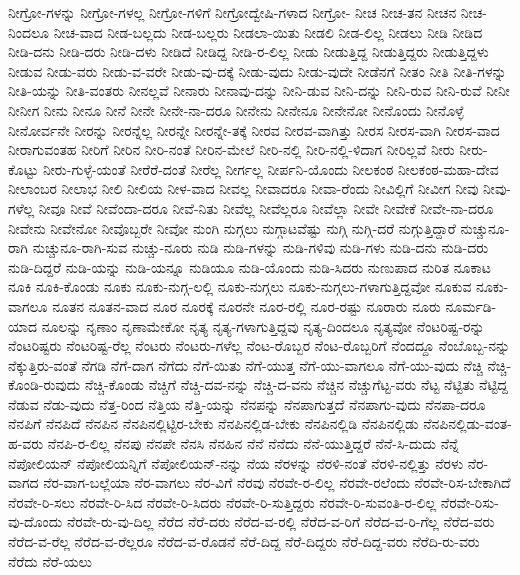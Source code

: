 {ನೀಗ್ರೋ-ಗಳನ್ನು
ನೀಗ್ರೋ-ಗಳಲ್ಲ
ನೀಗ್ರೋ-ಗಳಿಗೆ
ನೀಗ್ರೋದ್ವೇಷಿ-ಗಳಾದ
ನೀಗ್ರೋ-
ನೀಚ
ನೀಚ-ತನ
ನೀಚನ
ನೀಚ-ನಿಂದಲೂ
ನೀಚ-ವಾದ
ನೀಡ-ಬಲ್ಲದು
ನೀಡ-ಬಲ್ಲರು
ನೀಡಲಾ-ಯಿತು
ನೀಡಲಿ
ನೀಡ-ಲಿಲ್ಲ
ನೀಡಲು
ನೀಡಿ
ನೀಡಿದ
ನೀಡಿ-ದನು
ನೀಡಿ-ದರು
ನೀಡಿ-ದಳು
ನೀಡಿದೆ
ನೀಡಿದ್ದ
ನೀಡಿ-ರ-ಲಿಲ್ಲ
ನೀಡು
ನೀಡುತ್ತಿದ್ದ
ನೀಡುತ್ತಿದ್ದರು
ನೀಡುತ್ತಿದ್ದಳು
ನೀಡುವ
ನೀಡು-ವರು
ನೀಡು-ವ-ವರೇ
ನೀಡು-ವು-ದಕ್ಕೆ
ನೀಡು-ವುದು
ನೀಡು-ವುದೇ
ನೀಡೆನಗೆ
ನೀತಂ
ನೀತಿ
ನೀತಿ-ಗಳನ್ನು
ನೀತಿ-ಯನ್ನು
ನೀತಿ-ವಂತರು
ನೀನಲ್ಲವೆ
ನೀನಾರು
ನೀನಾವು-ದನ್ನು
ನೀನಿ-ಡುವ
ನೀನಿ-ದನ್ನು
ನೀನಿ-ರುವ
ನೀನಿ-ರುವೆ
ನೀನೀ
ನೀನೀಗ
ನೀನು
ನೀನೂ
ನೀನೆ
ನೀನೇ
ನೀನೇ-ನಾ-ದರೂ
ನೀನೇನು
ನೀನೇನೂ
ನೀನೇನೋ
ನೀನೊಂದು
ನೀನೊಳ್ಳೆ
ನೀನೋರ್ವನೇ
ನೀರನ್ನು
ನೀರನ್ನೆಲ್ಲ
ನೀರನ್ನೇ
ನೀರನ್ನೇ-ತಕ್ಕೆ
ನೀರವ
ನೀರವ-ವಾಗಿತ್ತು
ನೀರಸ
ನೀರಸ-ವಾಗಿ
ನೀರಸ-ವಾದ
ನೀರಾಗುವಂತಹ
ನೀರಿಗೆ
ನೀರಿನ
ನೀರಿ-ನಂತೆ
ನೀರಿನ-ಮೇಲೆ
ನೀರಿ-ನಲ್ಲಿ
ನೀರಿ-ನಲ್ಲಿ-ಳಿದಾಗ
ನೀರಿಲ್ಲವೆ
ನೀರು
ನೀರು-ಕೊಟ್ಟು
ನೀರು-ಗುಳ್ಳೆ-ಯಂತೆ
ನೀರೆರೆ-ದಂತೆ
ನೀರೆಲ್ಲ
ನೀರ್ಗಲ್ಲ
ನೀರ್ಪನಿ-ಯೊಂದು
ನೀಲಕಂಠ
ನೀಲಕಂಠ-ಮಹಾ-ದೇವ
ನೀಲಾಂಬರ
ನೀಲಾಭ
ನೀಲಿ
ನೀಲಿಯ
ನೀಳ-ವಾದ
ನೀವಲ್ಲ
ನೀವಾದರೂ
ನೀವಾ-ರೆಂದು
ನೀವಿಲ್ಲಿಗೆ
ನೀವೀಗ
ನೀವು
ನೀವು-ಗಳೆಲ್ಲ
ನೀವೂ
ನೀವೆ
ನೀವೆಂದಾ-ದರೂ
ನೀವೆ-ನಿತು
ನೀವೆಲ್ಲ
ನೀವೆಲ್ಲರೂ
ನೀವೆಲ್ಲಾ
ನೀವೇ
ನೀವೇಕೆ
ನೀವೇ-ನಾ-ದರೂ
ನೀವೇನು
ನೀವೇನೋ
ನೀವೊಬ್ಬರೇ
ನೀವೋ
ನುಂಗಿ
ನುಗ್ಗಲು
ನುಗ್ಗಾಟವೆಷ್ಟು
ನುಗ್ಗಿ
ನುಗ್ಗಿ-ದರೆ
ನುಗ್ಗುತ್ತಿದ್ದಾರೆ
ನುಚ್ಚುನೂ-ರಾಗಿ
ನುಚ್ಚುನೂ-ರಾಗಿ-ಸುವ
ನುಚ್ಚು-ನೂರು
ನುಡಿ
ನುಡಿ-ಗಳನ್ನು
ನುಡಿ-ಗಳಿವು
ನುಡಿ-ಗಳು
ನುಡಿ-ದನು
ನುಡಿ-ದರು
ನುಡಿ-ದಿದ್ದರೆ
ನುಡಿ-ಯನ್ನು
ನುಡಿ-ಯನ್ನೂ
ನುಡಿಯೂ
ನುಡಿ-ಯೊಂದು
ನುಡಿ-ಸಿದರು
ನುಣುಪಾದ
ನುರಿತ
ನೂಕಾಟ
ನೂಕಿ
ನೂಕಿ-ಕೊಂಡು
ನೂಕು
ನೂಕು-ನುಗ್ಗ-ಲಲ್ಲಿ
ನೂಕು-ನುಗ್ಗಲು
ನೂಕು-ನುಗ್ಗಲು-ಗಳಾಗುತ್ತಿದ್ದವೋ
ನೂಕುವ
ನೂಕು-ವಾಗಲೂ
ನೂತನ
ನೂತನ-ವಾದ
ನೂರ
ನೂರಕ್ಕೆ
ನೂರನೇ
ನೂರ-ರಲ್ಲಿ
ನೂರ-ರಷ್ಟು
ನೂರಾರು
ನೂರು
ನೂರ್ಮಡಿ-ಯಾದ
ನೂಲನ್ನು
ನೃಣಾಂ
ನೃಣಾಮೇಕೋ
ನೃತ್ಯ
ನೃತ್ಯ-ಗಳಾಗುತ್ತಿದ್ದವು
ನೃತ್ಯ-ದಿಂದಲೂ
ನೃತ್ಯವೋ
ನೆಂಟರಿಷ್ಟ-ರನ್ನು
ನೆಂಟರಿಷ್ಟರು
ನೆಂಟರಿಷ್ಟ-ರೆಲ್ಲ
ನೆಂಟರು
ನೆಂಟರು-ಗಳೆಲ್ಲ
ನೆಂಟ-ರೊಬ್ಬರ
ನೆಂಟ-ರೊಬ್ಬರಿಗೆ
ನೆಂದದ್ದೂ
ನೆಂಬೊಬ್ಬ-ನನ್ನು
ನೆಕ್ಕುತ್ತಿರು-ವಂತೆ
ನೆಗಡಿ
ನೆಗೆ-ದಾಗ
ನೆಗೆದು
ನೆಗೆ-ಯಿತು
ನೆಗೆ-ಯುತ್ತ
ನೆಗೆ-ಯು-ವಾಗಲೂ
ನೆಗೆ-ಯು-ವುದು
ನೆಚ್ಚಿ
ನೆಚ್ಚಿ-ಕೊಂಡಿ-ರುವುದು
ನೆಚ್ಚಿ-ಕೊಂಡು
ನೆಚ್ಚಿಗೆ
ನೆಚ್ಚಿ-ದವ-ನನ್ನು
ನೆಚ್ಚಿ-ದ-ವನು
ನೆಚ್ಚಿನ
ನೆಚ್ಚುಗೆಟ್ಟ-ವರು
ನೆಟ್ಟ
ನೆಟ್ಟಿತು
ನೆಟ್ಟಿದ್ದ
ನೆಡುವ
ನೆಡು-ವುದು
ನೆತ್ತ-ರಿಂದ
ನೆತ್ತಿಯ
ನೆತ್ತಿ-ಯನ್ನು
ನೆನಪನ್ನು
ನೆನಪಾಗುತ್ತದೆ
ನೆನಪಾಗು-ವುದು
ನೆನಪಾ-ದರೂ
ನೆನಪಿಗೆ
ನೆನಪಿದೆ
ನೆನಪಿನ
ನೆನಪಿನಲ್ಲಿಟ್ಟಿರ-ಬೇಕು
ನೆನಪಿನಲ್ಲಿಡ-ಬೇಕು
ನೆನಪಿನಲ್ಲಿಡಿ
ನೆನಪಿನಲ್ಲಿಡು
ನೆನಪಿನಲ್ಲಿಡು-ವಂತ-ಹ-ವರು
ನೆನಪಿ-ರ-ಲಿಲ್ಲ
ನೆನಪು
ನೆನಪೇ
ನೆನಸಿ
ನೆನಹಿನ
ನೆನೆ
ನೆನೆದು
ನೆನೆ-ಯುತ್ತಿದ್ದರೆ
ನೆನೆ-ಸಿ-ದುದು
ನೆನ್ನೆ
ನೆಪೋಲಿಯನ್
ನೆಪೋಲಿಯನ್ನಿಗೆ
ನೆಪೋಲಿಯನ್-ನನ್ನು
ನೆಯ
ನೆರಳನ್ನು
ನೆರಳಿ-ನಂತೆ
ನೆರಳಿ-ನಲ್ಲಿತ್ತು
ನೆರಳು
ನೆರ-ವಾಗದ
ನೆರ-ವಾಗ-ಬಲ್ಲೆಯಾ
ನೆರ-ವಾಗಲು
ನೆರ-ವಿಗೆ
ನೆರವು
ನೆರವೇ-ರ-ಲಿಲ್ಲ
ನೆರವೇ-ರಲೆಂದು
ನೆರವೇ-ರಿಸ-ಬೇಕಾಗಿದೆ
ನೆರವೇ-ರಿ-ಸಲು
ನೆರವೇ-ರಿ-ಸಿದ
ನೆರವೇ-ರಿ-ಸಿದರು
ನೆರವೇ-ರಿ-ಸುತ್ತಿದ್ದರು
ನೆರವೇ-ರಿ-ಸುವಂತಿ-ರ-ಲಿಲ್ಲ
ನೆರವೇ-ರಿಸು-ವು-ದೊಂದು
ನೆರವೇ-ರು-ವು-ದಿಲ್ಲ
ನೆರೆದ
ನೆರೆ-ದರು
ನೆರೆದ-ವ-ರಲ್ಲಿ
ನೆರೆದ-ವ-ರಿಗೆ
ನೆರೆದ-ವ-ರಿ-ಗೆಲ್ಲ
ನೆರೆದ-ವರು
ನೆರೆದ-ವ-ರೆಲ್ಲ
ನೆರೆದ-ವ-ರೆಲ್ಲರೂ
ನೆರೆದ-ವ-ರೊಡನೆ
ನೆರೆ-ದಿದ್ದ
ನೆರೆ-ದಿದ್ದರು
ನೆರೆ-ದಿದ್ದ-ವರು
ನೆರೆದಿ-ರು-ವರು
ನೆರೆದು
ನೆರೆ-ಯಲು
}
